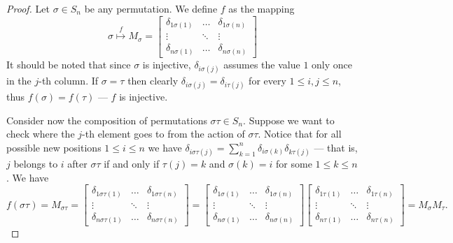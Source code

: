 \begin{proof}
    Let \(\sigma \in S_n\) be any permutation. We define \(f\) as the
    mapping
    \[
        \sigma \overset f \longmapsto M_\sigma =
        \begin{bmatrix}
            \delta_{1 \sigma(1)} & \dots  & \delta_{1 \sigma(n)} \\
            \vdots               & \ddots & \vdots               \\
            \delta_{n \sigma(1)} & \dots  & \delta_{n \sigma(n)}
        \end{bmatrix}
    \]
    It should be noted that since \(\sigma\) is injective, \(\delta_{i
        \sigma(j)}\) assumes the value \(1\) only once in the \(j\)-th column. If
    \(\sigma = \tau\) then clearly \(\delta_{i \sigma(j)} = \delta_{i \tau(j)}\)
    for every \(1 \leq i, j \leq n\), thus \(f(\sigma) = f(\tau)\) --- \(f\) is
    injective.

    Consider now the composition of permutations \(\sigma \tau \in S_n\).
    Suppose we want to check where the \(j\)-th element goes to from the action of
    \(\sigma \tau\). Notice that for all possible new positions \(1 \leq i \leq
    n\) we have \(\delta_{i \sigma\tau(j)} = \sum_{k = 1}^n \delta_{i \sigma(k)}
    \delta_{k \tau(j)}\) --- that is, \(j\) belongs to \(i\) after \(\sigma \tau\)
    if and only if \(\tau(j) = k\) and \(\sigma(k) = i\) for some \(1 \leq k \leq
    n\). We have
    \[
        f(\sigma \tau) = M_{\sigma \tau} =
        \begin{bmatrix}
            \delta_{1 \sigma\tau(1)} & \dots  & \delta_{1 \sigma\tau(n)} \\
            \vdots                   & \ddots & \vdots                   \\
            \delta_{n \sigma\tau(1)} & \dots  & \delta_{n \sigma\tau(n)}
        \end{bmatrix}
        =
        \begin{bmatrix}
            \delta_{1 \sigma(1)} & \dots  & \delta_{1 \sigma(n)} \\
            \vdots               & \ddots & \vdots               \\
            \delta_{n \sigma(1)} & \dots  & \delta_{n \sigma(n)}
        \end{bmatrix}
        \begin{bmatrix}
            \delta_{1 \tau(1)} & \dots  & \delta_{1 \tau(n)} \\
            \vdots             & \ddots & \vdots             \\
            \delta_{n \tau(1)} & \dots  & \delta_{n \tau(n)}
        \end{bmatrix}
        = M_\sigma M_\tau.
    \]
\end{proof}

